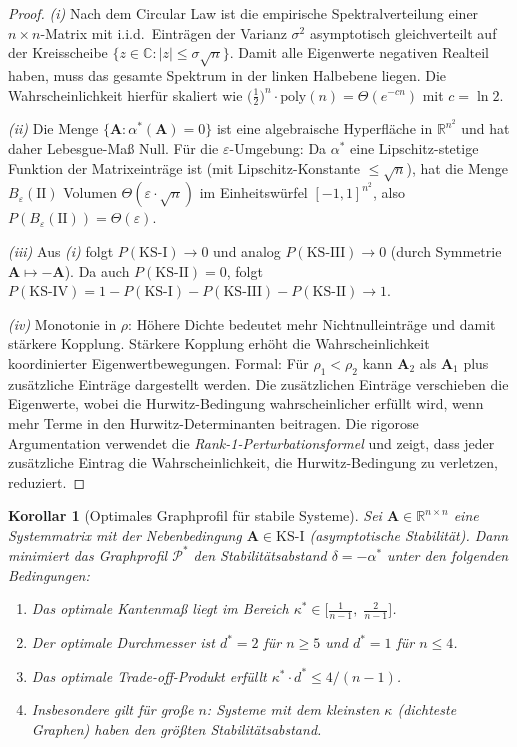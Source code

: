 \documentclass[a4paper, 12pt, twoside, openright]{report}
\newtheorem{corollary}[theorem]{Korollar}
\theoremstyle{definition}
\theoremstyle{definition}
\newcommand{\R}{\mathbb{R}}
\newcommand{\C}{\mathbb{C}}
\newcommand{\vA}{\bm{A}}
\newcommand{\KS}{\mathrm{KS}}
\begin{document}
\begin{proof}
\textit{(i)} Nach dem Circular Law ist die empirische Spektralverteilung einer
$n \times n$-Matrix mit i.i.d.\ Einträgen der Varianz $\sigma^2$ asymptotisch
gleichverteilt auf der Kreisscheibe $\{z \in \C : |z| \leq \sigma\sqrt{n}\}$.
Damit alle Eigenwerte negativen Realteil haben, muss das gesamte Spektrum in der
linken Halbebene liegen. Die Wahrscheinlichkeit hierfür skaliert wie
$\bigl(\frac{1}{2}\bigr)^n \cdot \mathrm{poly}(n) = \Theta(e^{-cn})$ mit
$c = \ln 2$.

\textit{(ii)} Die Menge $\{\vA : \alpha^*(\vA) = 0\}$ ist eine algebraische
Hyperfläche in $\R^{n^2}$ und hat daher Lebesgue-Maß Null. Für die
$\varepsilon$-Umgebung: Da $\alpha^*$ eine Lipschitz-stetige Funktion der
Matrixeinträge ist (mit Lipschitz-Konstante $\leq \sqrt{n}$), hat die Menge
$B_\varepsilon(\mathrm{II})$ Volumen $\Theta(\varepsilon \cdot \sqrt{n})$
im Einheitswürfel $[-1,1]^{n^2}$, also
$P(B_\varepsilon(\mathrm{II})) = \Theta(\varepsilon)$.

\textit{(iii)} Aus \textit{(i)} folgt $P(\KS\text{-I}) \to 0$ und analog
$P(\KS\text{-III}) \to 0$ (durch Symmetrie $\vA \mapsto -\vA$). Da auch
$P(\KS\text{-II}) = 0$, folgt $P(\KS\text{-IV}) = 1 - P(\KS\text{-I}) -
P(\KS\text{-III}) - P(\KS\text{-II}) \to 1$.

\textit{(iv)} Monotonie in $\rho$: Höhere Dichte bedeutet mehr Nichtnulleinträge
und damit stärkere Kopplung. Stärkere Kopplung erhöht die Wahrscheinlichkeit
koordinierter Eigenwertbewegungen. Formal: Für $\rho_1 < \rho_2$ kann $\vA_2$ als
$\vA_1$ plus zusätzliche Einträge dargestellt werden. Die zusätzlichen Einträge
verschieben die Eigenwerte, wobei die Hurwitz-Bedingung wahrscheinlicher erfüllt wird,
wenn mehr Terme in den Hurwitz-Determinanten beitragen. Die rigorose Argumentation
verwendet die \emph{Rank-1-Perturbationsformel} und zeigt, dass jeder zusätzliche
Eintrag die Wahrscheinlichkeit, die Hurwitz-Bedingung zu verletzen, reduziert.
\end{proof}

\begin{corollary}[Optimales Graphprofil für stabile Systeme]
\label{cor:opt_stabil}
Sei $\vA \in \R^{n \times n}$ eine Systemmatrix mit der Nebenbedingung
$\vA \in \KS\text{-I}$ (asymptotische Stabilität). Dann minimiert das Graphprofil
$\mathcal{P}^*$ den Stabilitätsabstand $\delta = -\alpha^*$ unter den folgenden
Bedingungen:
\begin{enumerate}[label=(\roman*)]
  \item Das optimale Kantenmaß liegt im Bereich
    $\kappa^* \in \bigl[\frac{1}{n-1},\; \frac{2}{n-1}\bigr]$.
  \item Der optimale Durchmesser ist $d^* = 2$ für $n \geq 5$ und $d^* = 1$
    für $n \leq 4$.
  \item Das optimale Trade-off-Produkt erfüllt
    $\kappa^* \cdot d^* \leq 4/(n-1)$.
  \item Insbesondere gilt für große $n$: Systeme mit dem kleinsten $\kappa$ (dichteste
    Graphen) haben den größten Stabilitätsabstand.
\end{enumerate}
\end{corollary}
\end{document}
